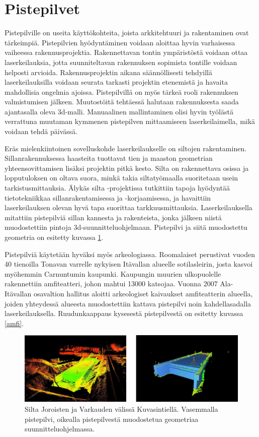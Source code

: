 \section{Pistepilvet}\label{pistepilvet}

Pistepilville on useita käyttökohteita, joista arkkitehtuuri ja rakentaminen ovat tärkeimpiä. Pistepilvien hyödyntäminen voidaan aloittaa hyvin varhaisessa vaiheessa rakennusprojektia. Rakennettavan tontin ympäristöstä voidaan ottaa laserkeilauksia, jotta suunniteltavan rakennuksen sopimista tontille voidaan helposti arvioida. Rakennusprojektin aikana säännöllisesti tehdyillä laserkeilauksilla voidaan seurata tarkasti projektin etenemistä ja havaita mahdollisia ongelmia ajoissa. Pistepilvillä on myös tärkeä rooli rakennuksen valmistumisen jälkeen. Muutostöitä tehtäessä halutaan rakennuksesta saada ajantasalla oleva 3d-malli. Manuaalinen mallintaminen olisi hyvin työlästä verrattuna muutaman kymmenen pistepilven mittaamiseen laserkeilaimella, mikä voidaan tehdä päivässä. \cite{bim} 

Eräs mielenkiintoinen sovelluskohde laserkeilaukselle on siltojen rakentaminen. Sillanrakennuksessa haasteita tuottavat tien ja maaston geometrian yhteensovittamisen lisäksi projektin pitkä kesto. Silta on rakennettava osissa ja lopputuloksen on oltava suora, minkä takia siltatyömaalla suoritetaan usein tarkistusmittauksia. Älykäs silta -projektissa tutkittiin tapoja hyödyntää tietotekniikkaa sillanrakentamisessa ja -korjaamisessa, ja havaittiin laserkeilauksen olevan hyvä tapa suorittaa tarkkuusmittauksia. Laserkeilauksella mitattiin pistepilviä sillan kannesta ja rakenteista, jonka jälkeen niistä muodostettiin pintoja 3d-suunnitteluohjelmaan. Pistepilvi ja siitä muodostettu geometria on esitetty kuvassa \ref{silt}. \cite{silta}   

Pistepilviä käytetään hyväksi myös arkeologiassa. Roomalaiset perustivat vuoden 40 tienoilla Tonavan varrelle nykyisen Itävallan alueelle
sotilasleirin, josta kasvoi myöhemmin Carnuntumin kaupunki. Kaupungin muurien ulkopuolelle rakennettiin amfiteatteri, johon mahtui 13000 katsojaa.
Vuonna 2007 Ala-Itävallan osavaltion hallitus aloitti arkeologiset kaivaukset amfiteatterin alueella, joiden yhteydessä alueesta muodostettiin kattava pistepilvi noin kahdellasadalla laserkeilauksella. Ruudunkaappaus kysesestä pistepilvestä on esitetty kuvassa \ref{amfi}. \cite{Carnuntum}

\begin{figure}
    \centering
    \includegraphics[width=\textwidth]{img/silta.png}
    \caption{Silta Joroisten ja Varkauden välissä Kuvasintiellä. Vasemmalla pistepilvi, oikealla pistepilvestä muodostetua geometriaa suunnitteluohjelmassa. \cite{silta}}
    \label{silt}
\end{figure}


